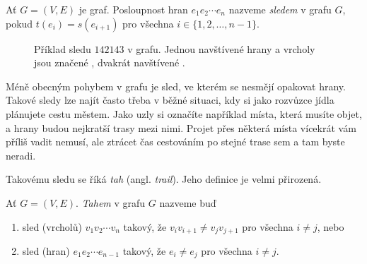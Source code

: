 \begin{definition}
\label{def:sled-podruhe}
 Ať $G = (V,E)$ je graf. Posloupnost hran $e_1e_2 \cdots e_n$ nazveme
 \emph{sledem} v grafu $G$, pokud $t(e_i) = s(e_{i+1})$ pro všechna $i \in
 \{1,2,\ldots,n-1\}$.
\end{definition}

\begin{figure}[h]
 \centering
 \caption{Příklad sledu $142143$ v grafu. Jednou navštívené hrany a vrcholy jsou
 značené , dvakrát navštívené .}
 \label{fig:priklad-sledu}
\end{figure}

Méně obecným pohybem v grafu je sled, ve kterém se nesmějí opakovat hrany.
Takové sledy lze najít často třeba v běžné situaci, kdy si jako rozvůzce jídla
plánujete cestu městem. Jako uzly si označíte například místa, která musíte
objet, a hrany budou nejkratší trasy mezi nimi. Projet přes některá místa
vícekrát vám příliš vadit nemusí, ale ztrácet čas cestováním po stejné trase
sem a tam byste neradi.

Takovému sledu se říká \emph{tah} (angl. \emph{trail}). Jeho definice je velmi
přirozená.

\begin{definition}[Tah]
\label{def:tah}
 Ať $G = (V,E)$. \emph{Tahem} v grafu $G$ nazveme buď
 \begin{enumerate}
  \item sled (vrcholů) $v_1v_2\cdots v_n$ takový, že $v_i v_{i+1} \neq v_j
   v_{j+1}$ pro všechna $i \neq j$, nebo
  \item sled (hran) $e_1e_2 \cdots e_{n-1}$ takový, že $e_i \neq e_j$ pro
   všechna $i \neq j$.
 \end{enumerate}
\end{definition}

